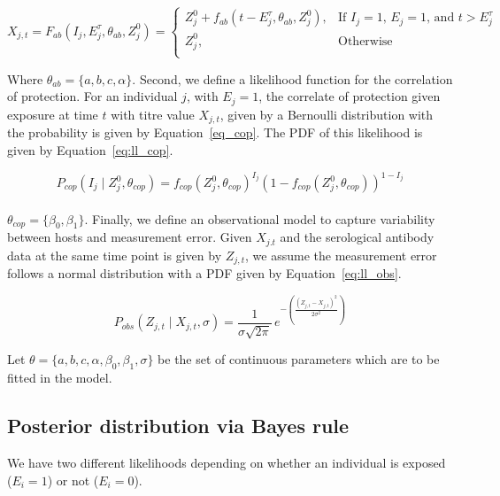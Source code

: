 \begin{equation}
\label{eq:ll_abkin}
X_{j,t}  = F_{ab}( I_j,  E_j^\tau, \theta_{ab}, Z^0_j) = 
	\begin{cases}
	Z^0_j + f_{ab}(t - E_j^\tau, \theta_{ab}, Z^0_j),  & \text{If $I_j = 1$, $E_j = 1$, and $t > E_j^\tau$} \\
	Z^0_j, & \text{Otherwise} \\ 
	\end{cases}
\end{equation}

Where $\theta_{ab} = \{a, b, c, \alpha\}$. Second, we define a likelihood function for the correlation of protection. For an individual $j$, with $E_j = 1$, the correlate of protection given exposure at time $t$ with titre value $X_{j, t}$, given by a Bernoulli distribution with the probability is given by Equation~\ref{eq_cop}. The PDF of this likelihood is given by Equation~\ref{eq:ll_cop}.

\begin{equation}
\label{eq:ll_cop}
P_{cop}(I_j \mid Z_{j}^0, \theta_{cop} ) =  f_{cop}(Z_{j}^0,  \theta_{cop})^{I_j}(1- f_{cop}(Z_{j}^0,  \theta_{cop} ))^{1-I_j}
\end{equation}

\paragraph{}$\theta_{cop} = \{\beta_0, \beta_1\}$. Finally, we define an observational model to capture variability between hosts and measurement error. Given $X_{j.t}$ and the serological antibody data at the same time point is given by $Z_{j, t}$, we assume the measurement error follows a normal distribution with a PDF given by Equation~\ref{eq:ll_obs}.

\begin{equation}
\label{eq:ll_obs}
P_{obs}(Z_{j,t} \mid X_{j,t}, \sigma) = \frac{1}{\sigma \sqrt{2\pi}} \, e^{-\left(\frac{(Z_{j,t} - X_{j,t})^2}{2\sigma^2}\right)}
\end{equation}

Let $\theta = \{a, b, c, \alpha, \beta_0, \beta_1, \sigma\}$ be the set of continuous parameters which are to be fitted in the model. 

\subsection{Posterior distribution via Bayes rule}

We have two different likelihoods depending on whether an individual is exposed ($E_i = 1$) or not ($E_i = 0$).

